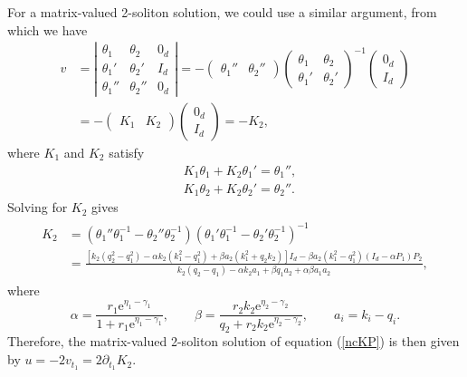 \documentclass[11p,reqno]{amsart}
\numberwithin{equation}{section}
\numberwithin{equation}{section}
\begin{document}
For a matrix-valued 2-soliton solution,  we could use a similar argument, from which we have
\begin{equation}
    \begin{split}
    v &= \left|\begin{array}{ccc}
        \theta_1&\theta_2&0_d\\
        \theta_1'&\theta_2'&I_d\\
       \theta_1''&\theta_2''& \boxed{0_d}
        \end{array}
        \right|=-\begin{pmatrix} \theta_1'' & \theta_2''\end{pmatrix}\begin{pmatrix} \theta_1&\theta_2 \\ \theta_1'&\theta_2'\end{pmatrix}^{-1} \begin{pmatrix} 0_d \\ I_d \end{pmatrix} \\
    & = - \begin{pmatrix} K_1 & K_2 \end{pmatrix} \begin{pmatrix} 0_d \\ I_d \end{pmatrix} = - K_2,
    \end{split}
\end{equation}
 where $K_1$ and $K_2$ satisfy
\begin{equation}
    \begin{split}
        &K_1\theta_1 + K_2\theta_1' = \theta_1'', \\
        &K_1\theta_2 + K_2\theta_2'= \theta_2''.
    \end{split}
\end{equation}
Solving for $K_2$ gives
\begin{align} \label{2-soliton}
\begin{aligned}
    K_2 &=(\theta_1''\theta_1^{-1}-\theta_2''\theta_2^{-1})(\theta_1'\theta_1^{-1}-\theta_2'\theta_2^{-1})^{-1}
    \\
   &=  \frac{\left[k_2\left(q_2^2-q_1^2\right)-\alpha k_2\left(k_1^2-q_1^2\right)+\beta a_2\left(k_1^2+q_2k_2\right)\right]I_d-\beta a_2\left(k_1^2-q_1^2\right)\left(I_d-\alpha P_1\right)P_2}{k_2\left(q_2-q_1\right)-\alpha k_2a_1+\beta q_1 a_2+\alpha \beta a_1a_2},
    \end{aligned}
\end{align}
where 
\begin{equation}
    \alpha = \frac{r_1 \mathrm{e}^{\eta_1-\gamma_1}}{1+r_1 \mathrm{e}^{\eta_1-\gamma_1}}, \qquad \beta =  \frac{r_2k_2 \mathrm{e}^{\eta_2-\gamma_2}}{q_2+r_2k_2 \mathrm{e}^{\eta_2-\gamma_2}}, \qquad a_i = k_i-q_i.
\end{equation}
Therefore, the matrix-valued 2-soliton solution of equation (\ref{ncKP}) is then given by $u = -2v_{t_1} = 2 \partial_{t_1} K_2$.
\end{document}
